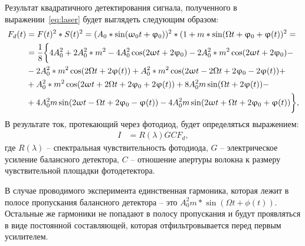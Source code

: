 Результат квадратичного детектирования сигнала, полученного в выражении~\eqref{eq:laser} будет выглядеть следующим образом:
\begin{align}
F_d(t) &= F(t)^2 * S(t)^2 = (A_0 * \sin (\omega_0 t + \phi_0))^2 * (1 + m*\sin (\Omega t + \phi_0 + \phi (t))^2=\notag \\
&= \frac{1}{8}\bigg \{4A_0^2 + 2A_0^2 *m^2 - 4A_0^2\cos(2\omega t + 2\phi_0) - 2A_0^2*m^2\cos(2\omega t + 2\phi_0) - \notag \\ & - 2A_0^2*m^2\cos(2\Omega t + 2\phi(t))  + A_0^2*m^2\cos(2\omega t - 2\Omega t + 2\phi_0 - 2\phi(t)) + \notag \\ & + A_0^2*m^2\cos(2\omega t + 2\Omega t + 2\phi_0 + 2\phi(t)) + 8A_0^2m\sin(\Omega t + 2\phi(t)) -\notag \\ & + 4A_0^2m\sin(2\omega t - \Omega t +2\phi_0 - \phi(t)) - 4A_0^2m\sin(2\omega t + \Omega t + 2\phi_0 + \phi(t))   \bigg\},
\end{align}
В результате ток, протекающий через фотодиод, будет определяться выражением:
\begin{align}
   I &= R(\lambda)G C F_d,
\end{align} 
где $R(\lambda)$ -- спектральная чувствительность фотодиода, $G$ -- электрическое усиление балансного детектора, $C$ -- отношение апертуры волокна к размеру чувствительной площадки фотодетектора. 

В случае проводимого эксперимента единственная гармоника, которая лежит в полосе пропускания балансного детектора -- это  $A_0^2m*\sin(\Omega t   + \phi (t))$.
Остальные же гармоники не попадают в полосу пропускания и будут проявляться в виде постоянной составляющей, которая отфильтровывается перед первым усилителем. 

